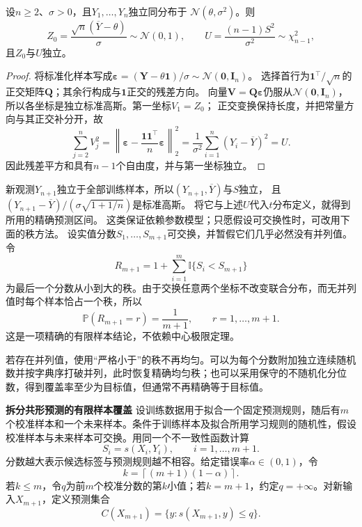 \begin{lemma}[高斯样本的均值与残差分解]
\label{lem:statistics-gaussian-mean-residual}
设\(n\geq2\)、\(\sigma>0\)，且\(Y_1,\ldots,Y_n\)独立同分布于
\(\mathcal N(\theta,\sigma^2)\)。则
\[
 Z_0=\frac{\sqrt n(\overline Y-\theta)}{\sigma}\sim\mathcal N(0,1),
 \qquad U=\frac{(n-1)S^2}{\sigma^2}\sim\chi^2_{n-1},
\]
且\(Z_0\)与\(U\)独立。
\end{lemma}
\begin{proof}
将标准化样本写成\(\bm\varepsilon=(\bm Y-\theta\bm1)/\sigma\sim\mathcal N(\bm0,\bm I_n)\)。
选择首行为\(\bm1^\top/\sqrt n\)的正交矩阵\(\bm Q\)；其余行构成与\(\bm1\)正交的残差方向。
向量\(\bm V=\bm Q\bm\varepsilon\)仍服从\(\mathcal N(\bm0,\bm I_n)\)，
所以各坐标是独立标准高斯。第一坐标\(V_1=Z_0\)；
正交变换保持长度，并把常量方向与其正交补分开，故
\[
 \sum_{j=2}^nV_j^2
 =\left\|\bm\varepsilon-\frac{\bm1\bm1^\top}{n}\bm\varepsilon\right\|_2^2
 =\frac1{\sigma^2}\sum_{i=1}^n(Y_i-\overline Y)^2=U.
\]
因此残差平方和具有\(n-1\)个自由度，并与第一坐标独立。
\end{proof}
新观测\(Y_{n+1}\)独立于全部训练样本，所以\((Y_{n+1},\overline Y)\)与\(S\)独立，
且\((Y_{n+1}-\overline Y)/(\sigma\sqrt{1+1/n})\)是标准高斯。
将它与上述\(U\)代入\(t\)分布定义，就得到所用的精确预测区间。
这类保证依赖参数模型；只愿假设可交换性时，可改用下面的秩方法。
设实值分数\(S_1,\ldots,S_{m+1}\)可交换，并暂假它们几乎必然没有并列值。令
\[ R_{m+1}
  =1+\sum_{i=1}^{m}\mathbb{I}\{S_i<S_{m+1}\} \]
为最后一个分数从小到大的秩。由于交换任意两个坐标不改变联合分布，而无并列值时每个样本恰占一个秩，所以
\begin{equation}
  \mathbb{P}(R_{m+1}=r)=\frac{1}{m+1},
  \qquad r=1,\ldots,m+1.
  \label{eq:probability-uniform-rank}
\end{equation}
这是一项精确的有限样本结论，不依赖中心极限定理。

若存在并列值，使用“严格小于”的秩不再均匀。可以为每个分数附加独立连续随机数并按字典序打破并列，此时恢复精确均匀秩；也可以采用保守的不随机化分位数，得到覆盖率至少为目标值，但通常不再精确等于目标值。

\par\medskip\noindent\textbf{拆分共形预测的有限样本覆盖}\quad
设训练数据用于拟合一个固定预测规则，随后有\(m\)个校准样本和一个未来样本。条件于训练样本及拟合所用学习规则的随机性，假设校准样本与未来样本可交换。用同一个不一致性函数计算
\[ S_i=s(X_i,Y_i),
  \qquad i=1,\ldots,m+1. \]
分数越大表示候选标签与预测规则越不相容。给定错误率\(\alpha\in(0,1)\)，令
\[ k=\left\lceil(m+1)(1-\alpha)\right\rceil. \]
若\(k\leq m\)，令\(q\)为前\(m\)个校准分数的第\(k\)小值；若\(k=m+1\)，约定\(q=+\infty\)。对新输入\(X_{m+1}\)，定义预测集合
\begin{equation}
  C(X_{m+1})
  =
  \{y:s(X_{m+1},y)\leq q\}.
  \label{eq:probability-split-conformal-set}
\end{equation}

